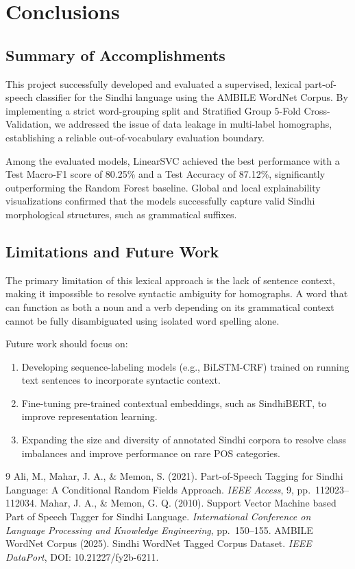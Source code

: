 \documentclass[12pt,a4paper]{article}
\begin{document}
\section{Conclusions}

\subsection{Summary of Accomplishments}
This project successfully developed and evaluated a supervised, lexical part-of-speech classifier for the Sindhi language using the AMBILE WordNet Corpus. By implementing a strict word-grouping split and Stratified Group 5-Fold Cross-Validation, we addressed the issue of data leakage in multi-label homographs, establishing a reliable out-of-vocabulary evaluation boundary. 

Among the evaluated models, LinearSVC achieved the best performance with a Test Macro-F1 score of 80.25\% and a Test Accuracy of 87.12\%, significantly outperforming the Random Forest baseline. Global and local explainability visualizations confirmed that the models successfully capture valid Sindhi morphological structures, such as grammatical suffixes.

\subsection{Limitations and Future Work}
The primary limitation of this lexical approach is the lack of sentence context, making it impossible to resolve syntactic ambiguity for homographs. A word that can function as both a noun and a verb depending on its grammatical context cannot be fully disambiguated using isolated word spelling alone.

Future work should focus on:
\begin{enumerate}
  \item Developing sequence-labeling models (e.g., BiLSTM-CRF) trained on running text sentences to incorporate syntactic context.
  \item Fine-tuning pre-trained contextual embeddings, such as SindhiBERT, to improve representation learning.
  \item Expanding the size and diversity of annotated Sindhi corpora to resolve class imbalances and improve performance on rare POS categories.
\end{enumerate}

\begin{thebibliography}{9}
    Ali, M., Mahar, J. A., \& Memon, S. (2021).
    Part-of-Speech Tagging for Sindhi Language: A Conditional Random Fields Approach.
    \textit{IEEE Access}, 9, pp.~112023--112034.
    Mahar, J. A., \& Memon, G. Q. (2010).
    Support Vector Machine based Part of Speech Tagger for Sindhi Language.
    \textit{International Conference on Language Processing and Knowledge Engineering}, pp.~150--155.
    AMBILE WordNet Corpus (2025).
    Sindhi WordNet Tagged Corpus Dataset.
    \textit{IEEE DataPort}, DOI: 10.21227/fy2b-6211.
\end{thebibliography}
\end{document}
